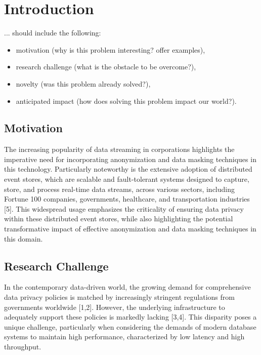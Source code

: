 \chapter{Introduction\label{cha:chapter1}}

... should include the following:
\begin{itemize}
\item motivation (why is this problem interesting? offer examples),
\item research challenge (what is the obstacle to be overcome?),
\item novelty (was this problem already solved?),
\item anticipated impact (how does solving this problem impact our world?).
\end{itemize}

\section{Motivation\label{sec:moti}}
The increasing popularity of data streaming in corporations highlights the imperative need for incorporating anonymization and data masking techniques in this technology. Particularly noteworthy is the extensive adoption of distributed event stores, which are scalable and fault-tolerant systems designed to capture, store, and process real-time data streams, across various sectors, including Fortune 100 companies, governments, healthcare, and transportation industries [5]. This widespread usage emphasizes the criticality of ensuring data privacy within these distributed event stores, while also highlighting the potential transformative impact of effective anonymization and data masking techniques in this domain.


\section{Research Challenge\label{sec:objective}}
In the contemporary data-driven world, the growing demand for comprehensive data privacy policies is matched by increasingly stringent regulations from governments worldwide [1,2]. However, the underlying infrastructure to adequately support these policies is markedly lacking [3,4]. This disparity poses a unique challenge, particularly when considering the demands of modern database systems to maintain high performance, characterized by low latency and high throughput.

